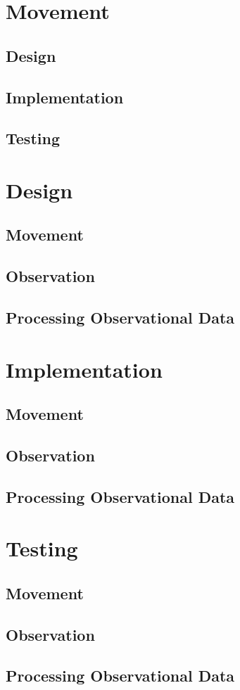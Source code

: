 		
		
	\chapter{Movement}
		\section{Design}
		\section{Implementation}
		\section{Testing}
	
	\chapter{Design}
		\section{Movement}
		\section{Observation}
		\section{Processing Observational Data}
		
	\chapter{Implementation}
		\section{Movement}
		\section{Observation}
		\section{Processing Observational Data}
		
	\chapter{Testing}
		\section{Movement}
		\section{Observation}
		\section{Processing Observational Data}